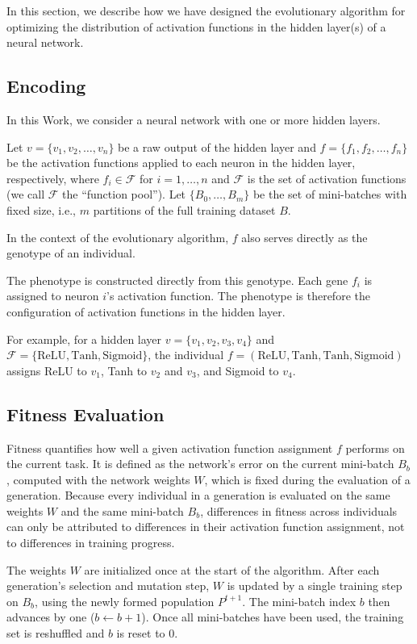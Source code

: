 In this section, we describe how we have designed the evolutionary algorithm for optimizing the distribution of activation functions in the hidden layer(s) of a neural network.

\subsection{Encoding}
\label{sec:encoding}
In this Work, we consider a neural network with one or more hidden layers.

Let \(v=\{v_1, v_2, \dots, v_n\} \) be a raw output of the hidden layer and 
\(f = \{f_1, f_2, \dots, f_n\}\) be the activation functions applied to each neuron in the hidden layer, respectively,
where \(f_i \in \mathcal{F}\) for \(i=1,\dots,n\) and \(\mathcal{F}\) is the set of activation functions (we call \(\mathcal{F}\) the ``function pool'').
Let \(\{B_0, \dots, B_m\}\) be the set of mini-batches with fixed size, i.e., $m$ partitions of the full training dataset $B$.

In the context of the evolutionary algorithm, $f$ also serves directly as the genotype
of an individual. 

The phenotype is constructed directly from this genotype. 
Each gene $f_i$ is assigned to neuron $i$'s activation function.
The phenotype is therefore the configuration of activation functions in the hidden layer.

For example, for a hidden layer $v = \{v_1, v_2, v_3, v_4\}$ and $\mathcal{F} = \{\text{ReLU}, \text{Tanh}, \text{Sigmoid}\}$,
the individual $f = (\text{ReLU}, \text{Tanh}, \text{Tanh}, \text{Sigmoid})$
assigns ReLU to $v_1$, Tanh to $v_2$ and $v_3$, and Sigmoid to $v_4$.

\subsection{Fitness Evaluation}
Fitness quantifies how well a given activation function assignment $f$ performs
on the current task. It is defined as the network's error on the current
mini-batch $B_b$, computed with the network weights $W$, which is fixed during the evaluation of a generation. 
Because every individual in a generation is
evaluated on the same weights $W$ and the same mini-batch $B_b$, differences in
fitness across individuals can only be attributed to differences in their
activation function assignment, not to differences in training progress.

The weights $W$ are initialized once at
the start of the algorithm. After each generation's selection and mutation
step, $W$ is updated by a single training step on $B_b$, using the newly formed
population $P^{t+1}$. The mini-batch index $b$ then advances by one
($b \leftarrow b+1$). Once all mini-batches have been used, the training set is
reshuffled and $b$ is reset to $0$.

